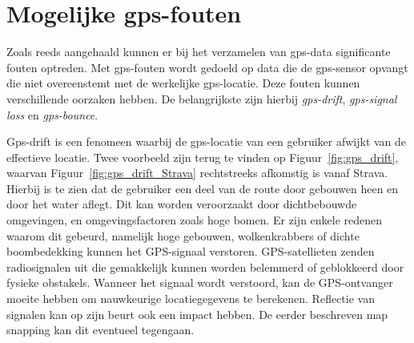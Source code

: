 \section{Mogelijke gps-fouten}\label{sec:gps-fouten}
Zoals reeds aangehaald kunnen er bij het verzamelen van \ac{gps}-data
significante fouten optreden. Met \ac{gps}-fouten wordt gedoeld op data die de
\ac{gps}-sensor opvangt die niet overeenstemt met de werkelijke
\ac{gps}-locatie. Deze fouten kunnen verschillende oorzaken hebben. De
belangrijkste zijn hierbij \textit{\ac{gps}-drift}, \textit{\ac{gps}-signal
    loss} en \textit{\ac{gps}-bounce}.

Gps-drift is een fenomeen waarbij de \ac{gps}-locatie van een gebruiker afwijkt
van de effectieve locatie. Twee voorbeeld zijn terug te vinden op
Figuur~\ref{fig:gps_drift}, waarvan Figuur~\ref{fig:gps_drift_Strava}
rechtstreeks afkomstig is vanaf Strava. Hierbij is te zien dat de gebruiker een
deel van de route door gebouwen heen en door het water aflegt. Dit kan worden
veroorzaakt door dichtbebouwde omgevingen, en omgevingsfactoren zoals hoge
bomen. Er zijn enkele redenen waarom dit gebeurd, namelijk hoge gebouwen,
wolkenkrabbers of dichte boombedekking kunnen het GPS-signaal verstoren.
GPS-satellieten zenden radiosignalen uit die gemakkelijk kunnen worden
belemmerd of geblokkeerd door fysieke obstakels. Wanneer het signaal wordt
verstoord, kan de GPS-ontvanger moeite hebben om nauwkeurige locatiegegevens te
berekenen. Reflectie van signalen kan op zijn beurt ook een impact hebben. De
eerder beschreven map snapping kan dit eventueel tegengaan.
